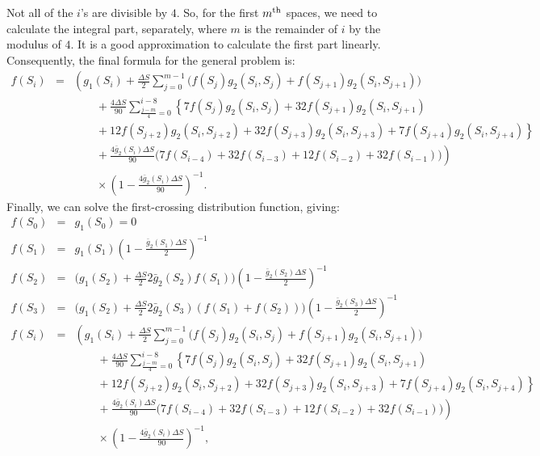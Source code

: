 Not all of the $i$'s are divisible by $4$. So, for the first $m^{\rm th}$ spaces, we need to calculate the integral part, separately, where $m$ is the remainder of $i$ by the modulus of $4$. It is a good approximation to calculate the first part linearly. Consequently, the final formula for the general problem is: 
\begin{eqnarray}
       f(S_i)  &=&  \left( g_1(S_i) + \frac{ \Delta S}{2}  \sum_{j=0}^{m-1}   \Big( f(S_j) g_2(S_i, S_j) + f(S_{j+1}) g_2(S_i, S_{j+1})   \Big) \right.\nonumber\\
       &&\qquad \left. {}     +  \frac{ 4 \Delta S}{90}  \sum_{\frac{j-m}{4}=0}^{i-8}   \left\{ 7 f(S_j) g_2(S_i, S_j)  + 32 f(S_{j+1}) g_2(S_i, S_{j+1})  \right.\right.\nonumber\\
       &&\qquad \left.\left. {}     + 12 f(S_{j+2}) g_2(S_i, S_{j+2})  + 32 f(S_{j+3}) g_2(S_i, S_{j+3})  + 7 f(S_{j+4}) g_2(S_i, S_{j+4})    \right\} \right. \nonumber\\ 
       &&\qquad \left. {}     + \frac{4  \bar{g}_2(S_i) \Delta S}{90} \Big( 7 f(S_{i-4}) + 32 f(S_{i-3}) + 12 f(S_{i-2}) + 32 f(S_{i-1})   \Big) \right) \nonumber\\
       &&\qquad {}     \times \left( 1 -  \frac{ 4  \bar{g}_2(S_i) \Delta S }{90}  \right)^{-1}.
\end{eqnarray}
Finally, we can solve the first-crossing distribution function, giving:
\begin{eqnarray}
       f(S_0)  &=&  g_1(S_0) = 0  \\
       f(S_1)  &=&  g_1(S_1) \left( 1 -  \frac{\bar{g}_2(S_1) \Delta S}{2}  \right)^{-1}   \\
       f(S_2)  &=&  \Big( g_1(S_2) + \frac{ \Delta S}{2} 2 \bar{g}_2(S_2) f(S_1) \Big) \left( 1 -  \frac{ \bar{g}_2(S_2) \Delta S}{2}  \right)^{-1}   \\
       f(S_3)  &=&  \Big( g_1(S_2) + \frac{ \Delta S}{2} 2 \bar{g}_2(S_3) (f(S_1) + f(S_2)) \Big) \left( 1 -  \frac{ \bar{g}_2(S_3) \Delta S}{2}  \right)^{-1}   \\
       f(S_i)  &=&  \left( g_1(S_i) + \frac{ \Delta S}{2}  \sum_{j=0}^{m-1}   \Big( f(S_j) g_2(S_i, S_j) + f(S_{j+1}) g_2(S_i, S_{j+1})   \Big) \right.\nonumber\\
       &&\qquad \left. {}     +  \frac{ 4 \Delta S}{90}  \sum_{\frac{j-m}{4}=0}^{i-8}   \left\{ 7 f(S_j) g_2(S_i, S_j) + 32 f(S_{j+1}) g_2(S_i, S_{j+1})  \right.\right.\nonumber\\
       &&\qquad \left.\left. {}     + 12 f(S_{j+2}) g_2(S_i, S_{j+2}) + 32 f(S_{j+3}) g_2(S_i, S_{j+3}) + 7 f(S_{j+4}) g_2(S_i, S_{j+4})    \right\} \right. \nonumber\\ 
       &&\qquad \left. {}     + \frac{4  \bar{g}_2(S_i) \Delta S}{90} \Big( 7 f(S_{i-4}) + 32 f(S_{i-3})+ 12 f(S_{i-2}) + 32 f(S_{i-1})  \Big) \right) \nonumber\\
       &&\qquad {}     \times \left( 1 -  \frac{ 4  \bar{g}_2(S_i) \Delta S}{90}  \right)^{-1},
\end{eqnarray}
